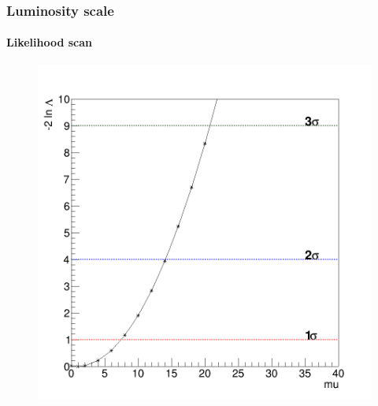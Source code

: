 \documentclass[11pt]{beamer}
\begin{document}
\begin{frame}
\frametitle{Luminosity scale}
\framesubtitle{Likelihood scan}
\begin{center}
	\begin{figure}
	\includegraphics[scale=0.25]{figures/150fb/Likelihood.png}
\end{figure}
\end{center}
\end{frame}
\end{document}
